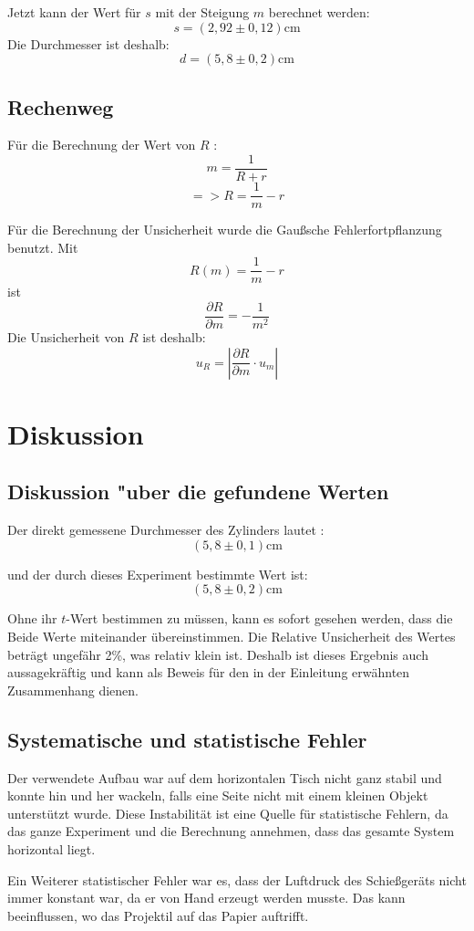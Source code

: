 \documentclass[11pt,a4paper]{article}
\begin{document}
Jetzt kann der Wert für $s$ mit der Steigung $m$ berechnet werden:
$$ s = (2,92 \pm 0,12) \textrm{cm} $$
Die Durchmesser ist deshalb:
$$ d = (5,8 \pm 0,2) \textrm{cm}$$
\begin{tcolorbox}[colback=white]
\subsection{Rechenweg}
Für die Berechnung der Wert von  $R$ :
$$ m= \frac{1}{R+r}$$
$$ => R = \frac{1}{m}-r$$ 


Für die Berechnung der Unsicherheit wurde die Gaußsche Fehlerfortpflanzung benutzt. Mit
$$R(m) = \frac{1}{m}-r$$ 
ist
$$\frac{\partial R}{\partial m} = -\frac{1}{m^2}$$
Die Unsicherheit von $R$ ist deshalb:
$$u_R = \left|\frac{\partial R}{\partial m}\cdot u_m\right|$$

	
\end{tcolorbox}
\section{Diskussion}


\subsection{Diskussion "uber die gefundene Werten}
Der direkt gemessene Durchmesser des Zylinders lautet :
$$(5,8\pm0,1) \textrm{cm}$$

und der durch dieses Experiment bestimmte Wert ist: 
$$(5,8\pm0,2) \textrm{cm} $$

Ohne ihr $t$-Wert bestimmen zu müssen, kann es sofort gesehen werden, dass die Beide Werte miteinander übereinstimmen. Die Relative Unsicherheit des Wertes beträgt ungefähr 2\%, was relativ klein ist. Deshalb ist dieses Ergebnis auch aussagekräftig und kann als Beweis für den in der Einleitung erwähnten Zusammenhang dienen. 
 
\subsection{Systematische und statistische Fehler}
Der verwendete Aufbau war auf dem horizontalen Tisch nicht ganz stabil und konnte hin und her wackeln, falls eine Seite nicht mit einem kleinen Objekt unterstützt wurde. Diese Instabilität ist eine Quelle für statistische Fehlern, da das ganze Experiment und die Berechnung annehmen, dass das gesamte System horizontal liegt. 

Ein Weiterer statistischer Fehler war es, dass der Luftdruck des Schießgeräts nicht immer konstant war, da er von Hand erzeugt werden musste. Das kann beeinflussen, wo das Projektil auf das Papier auftrifft. 
\end{document}
